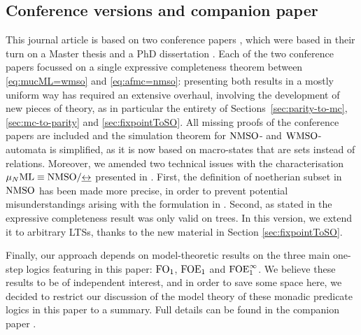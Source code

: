 \subsection{Conference versions and companion paper}
This journal article is based on two conference papers
\cite{DBLP:conf/lics/FacchiniVZ13,DBLP:conf/csl/CarreiroFVZ14},
which were based in their turn on a Master thesis \cite{Zanasi:Thesis:2012}
and a PhD dissertation \cite{carr:frag2015}.
Each of the two conference papers focussed on a single expressive completeness 
theorem between \eqref{eq:mucML=wmso} and \eqref{eq:afmc=nmso}: presenting both
results in a mostly uniform way has required an extensive overhaul, involving
the development of new pieces of theory, as in particular the entirety of 
Sections~\ref{sec:parity-to-mc}, \ref{sec:mc-to-parity} 
and \ref{sec:fixpointToSO}. 
All missing proofs of the conference papers are included and the simulation
theorem for $\mathrm{NMSO}$- and $\mathrm{WMSO}$-automata is simplified, as it is now based
on macro-states that are sets instead of relations. 
Moreover, we amended two technical issues with the characterisation 
$\mu_{N}\mathrm{ML} \equiv \mathrm{NMSO} /{\mathrel{\underline{\leftrightarrow}}}$ presented in \cite{DBLP:conf/lics/FacchiniVZ13}.
First, the definition of noetherian subset in $\mathrm{NMSO}$ has been made more 
precise, in order to prevent potential misunderstandings arising with the
formulation in \cite{DBLP:conf/lics/FacchiniVZ13}. 
Second, as stated in \cite{DBLP:conf/lics/FacchiniVZ13} the expressive 
completeness result was only valid on trees. 
In this version, we extend it to arbitrary LTSs, thanks to the new material 
in Section \ref{sec:fixpointToSO}. 

Finally, our approach depends on model-theoretic results on the three main
one-step logics featuring in this paper: $\mathrm{FO}_1$, $\mathrm{FOE}_1$ and $\mathrm{FOE}^{\infty}_1$.
We believe these results to be of independent interest, and in order to save
some space here, we decided to restrict our discussion of the model theory of
these monadic predicate logics in this paper to a summary.
Full details can be found in the companion paper \cite{carr:mode18}.
